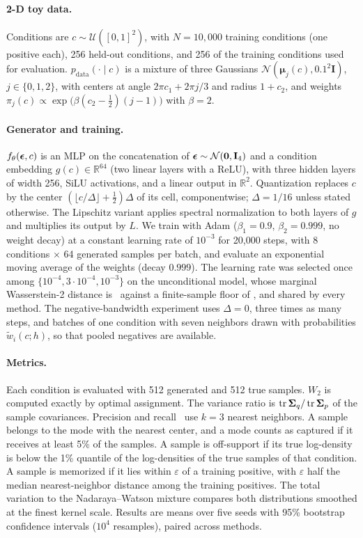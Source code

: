 \paragraph{2-D toy data.} Conditions are $c\sim\mathcal U([0,1]^2)$, with $N=10{,}000$ training conditions (one positive
each), 256 held-out conditions, and 256 of the training conditions used for evaluation. $p_\mathrm{data}(\cdot\mid c)$ is a
mixture of three Gaussians $\mathcal N(\boldsymbol\mu_j(c),0.1^2\mathbf I)$, $j\in\{0,1,2\}$, with centers at angle
$2\pi c_1+2\pi j/3$ and radius $1+c_2$, and weights $\pi_j(c)\propto\exp\big(\beta(c_2-\tfrac12)(j-1)\big)$ with
$\beta=2$.

\paragraph{Generator and training.} $f_\theta(\boldsymbol{\epsilon},c)$ is an MLP on the concatenation of $\boldsymbol{\epsilon}\sim\mathcal N(\mathbf 0,\mathbf I_4)$
and a condition embedding $g(c)\in\mathbb R^{64}$ (two linear layers with a ReLU), with three hidden layers of width
256, SiLU activations, and a linear output in $\mathbb R^2$. Quantization replaces $c$ by the center
$(\lfloor c/\Delta\rfloor+\tfrac12)\Delta$ of its cell, componentwise; $\Delta=1/16$ unless stated otherwise. The
Lipschitz variant applies spectral normalization to both layers of $g$ and multiplies its output by $L$. We train with
Adam ($\beta_1=0.9$, $\beta_2=0.999$, no weight decay) at a constant learning rate of $10^{-3}$ for 20{,}000 steps, with
8 conditions $\times$ 64 generated samples per batch, and evaluate an exponential moving average of the weights (decay
$0.999$). The learning rate was selected once among $\{10^{-4},3\cdot10^{-4},10^{-3}\}$ on the unconditional model,
whose marginal Wasserstein-2 distance is \GFourCW\ against a finite-sample floor of \GFourCFloor, and shared by every
method. The negative-bandwidth experiment uses $\Delta=0$, three times as many steps, and batches of one condition with
seven neighbors drawn with probabilities $\tilde w_i(c;h)$, so that pooled negatives are available.

\paragraph{Metrics.} Each condition is evaluated with 512 generated and 512 true samples. $W_2$ is computed exactly
by optimal assignment. The variance ratio is $\operatorname{tr}\boldsymbol{\Sigma}_q/\operatorname{tr}\boldsymbol{\Sigma}_p$ of the sample covariances.
Precision and recall~\cite{kynkaanniemi2019improved} use $k=3$ nearest neighbors. A sample belongs to the mode with
the nearest center, and a mode counts as captured if it receives at least 5\% of the samples. A sample is off-support if
its true log-density is below the 1\% quantile of the log-densities of the true samples of that condition. A sample is
memorized if it lies within $\varepsilon$ of a training positive, with $\varepsilon$ half the median nearest-neighbor
distance among the training positives. The total variation to the Nadaraya--Watson mixture compares both
distributions smoothed at the finest kernel scale. Results are means over five seeds with 95\% bootstrap confidence
intervals ($10^4$ resamples), paired across methods.
